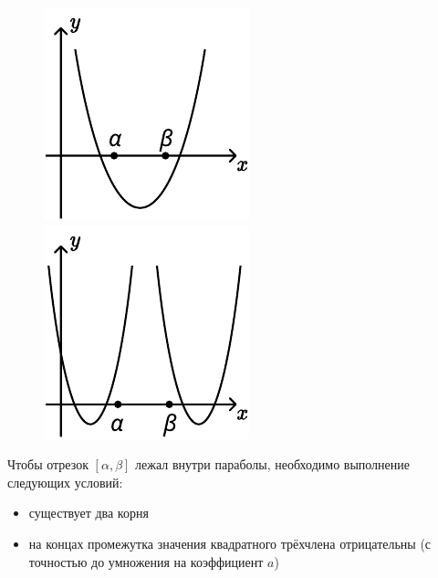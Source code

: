 \begin {figure}[h]
    \begin {minipage} [t] {0.5\linewidth}
        \centering
        \includegraphics [width=0.6\linewidth] {images/image_08.pdf}
    \end {minipage}
    \hfill
    \begin {minipage} [t] {0.5\linewidth}
        \centering
        \includegraphics [width=0.6\linewidth] {images/image_09.pdf}
    \end {minipage}
\end {figure}

Чтобы отрезок $[\alpha, \beta]$ лежал внутри параболы, необходимо выполнение следующих условий:

\begin {itemize}
    \item {существует два корня}
    \item {на концах промежутка значения квадратного трёхчлена отрицательны (с точностью до
        умножения на коэффициент $a$)}
\end {itemize}

